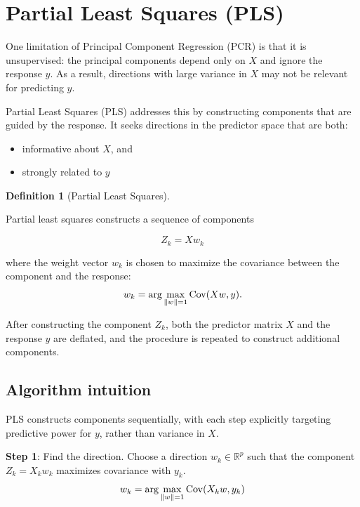 \documentclass[
  letterpaper,
  DIV=11,
  numbers=noendperiod]{scrreprt}
\providecommand{\tightlist}{%
  \setlength{\itemsep}{0pt}\setlength{\parskip}{0pt}}
\newcommand{\Cov}{\operatorname{Cov}}
\theoremstyle{definition}
\newtheorem{definition}{Definition}[chapter]
\theoremstyle{definition}
\theoremstyle{plain}
\theoremstyle{plain}
\theoremstyle{remark}
\begin{document}
\section{Partial Least Squares (PLS)}\label{partial-least-squares-pls}

One limitation of Principal Component Regression (PCR) is that it is
unsupervised: the principal components depend only on \(X\) and ignore
the response \(y\). As a result, directions with large variance in \(X\)
may not be relevant for predicting \(y\).

Partial Least Squares (PLS) addresses this by constructing components
that are guided by the response. It seeks directions in the predictor
space that are both:

\begin{itemize}
\tightlist
\item
  informative about \(X\), and
\item
  strongly related to \(y\)
\end{itemize}

\begin{definition}[Partial Least
Squares]\protect\hypertarget{def-pls}{}\label{def-pls}

Partial least squares constructs a sequence of components

\[
Z_k = X w_k
\]

where the weight vector \(w_k\) is chosen to maximize the covariance
between the component and the response: \[
w_k =\arg\max_{\norm{w}=1}\Cov(Xw, y).
\]

After constructing the component \(Z_k\), both the predictor matrix
\(X\) and the response \(y\) are deflated, and the procedure is repeated
to construct additional components.

\end{definition}

\subsection{Algorithm intuition}\label{algorithm-intuition}

PLS constructs components sequentially, with each step explicitly
targeting predictive power for \(y\), rather than variance in \(X\).

\textbf{Step 1}: Find the direction. Choose a direction
\(w_k \in \mathbb{R}^p\) such that the component \(Z_k = X_k w_k\)
maximizes covariance with \(y_k\). \[
w_k =\arg\max_{\norm{w}=1}\Cov(X_kw, y_k)
\]
\end{document}
